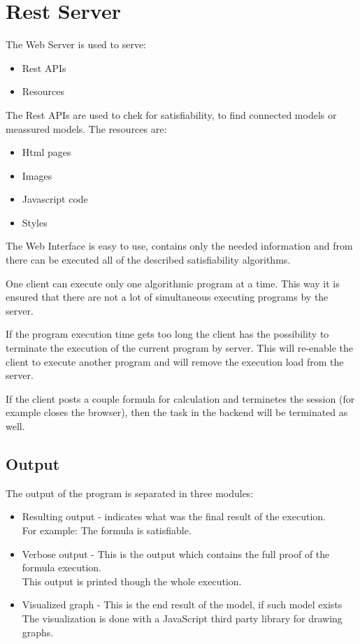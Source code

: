 \documentclass{article}
\begin{document}
	\section{Rest Server}
		The Web Server is used to serve:
		\begin{itemize}
			\item Rest APIs
			\item Resources
		\end{itemize}
		The Rest APIs are used to chek for satisfiability, to find connected models or meassured models.
		\newline
		The resources are:
		\begin{itemize}
			\item Html pages
			\item Images 
			\item Javascript code
			\item Styles
		\end{itemize}
		The Web Interface is easy to use, contains only the needed information and from there 
		can be executed all of the described satisfiability algorithms.

		One client can execute only one algorithmic program at a time. 
		This way it is ensured that there are not a lot of simultaneous executing programs by the server.
		
		If the program execution time gets too long the client has the possibility to terminate the execution 
		of the current program by server. This will re-enable the client to execute another program and will remove 
		the execution load from the server.

		If the client posts a couple formula for calculation and terminetes the session (for example closes the browser),
		then the task in the backend will be terminated as well.

		\subsection*{Output}
		The output of the program is separated in three modules:
		\begin{itemize}
			\item Resulting output - indicates what was the final result of the execution. \\
				For example: The formula is satisfiable.
			\item Verbose output - This is the output which contains the full proof of the formula execution. \\
				This output is printed though the whole execution.
			\item Visualized graph - This is the end result of the model, if such model exists \\
				The visualization is done with a JavaScript third party library for drawing graphs.
		\end{itemize}
\end{document}
